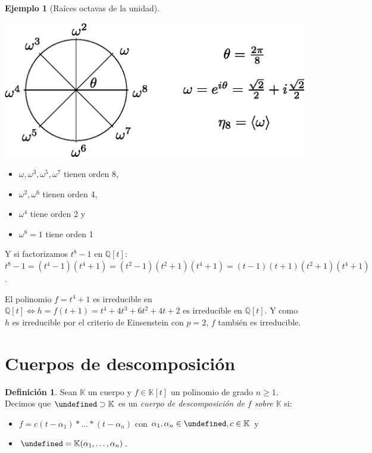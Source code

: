 \documentclass[10pt, spanish]{report}
\theoremstyle{definition}
\newtheorem*{defin}{Definición}
\newtheorem*{ej}{Ejemplo}
\newcommand{\Q}{\mathbb{Q}}
\newcommand{\K}{\mathbb{K}}
\let\L\undefined
\newcommand{\L}{\mathbb{L}}
\renewcommand{\geq}{\geqslant}
\newcommand{\fecha}[1]{\marginpar{\underline{\footnotesize{#1}}}}
\begin{document}
\fecha{3/03}
\begin{ej}[Raíces octavas de la unidad]\hspace{2em}\vspace{1em}
    \begin{multicols}{2}

        \includegraphics[scale=0.6]{fig01.eps}
    \begin{itemize}
        \item $\omega,\omega^3,\omega^5,\omega^7$  tienen orden 8,
        \item $\omega^2,\omega^6$ tienen orden 4,
        \item $\omega^4$ tiene orden 2 y
        \item $\omega^8=1$ tiene orden 1
    \end{itemize}


    \end{multicols}

    Y si factorizamos $t^8-1$ en $\Q[t]$:
    $t^8-1=(t^4-1)(t^4+1)=(t^2-1)(t^2+1)(t^4+1)=(t-1)(t+1)(t^2+1)(t^4+1)$.

    El polinomio $f=t^4+1$ es irreducible en $\Q[t] \Leftrightarrow
    h=f(t+1)=t^4+4t^3+6t^2+4t+2$  es irreducible en $\Q[t]$. Y como $h$ es
    irreducible por el criterio de Einsenstein con $p=2$, $f$ también es
    irreducible.
\end{ej}

\section{Cuerpos de descomposición}

\begin{defin}
    Sean $\K$ un cuerpo y $f\in\K[t]$ un polinomio de grado $n\geq1$. Decimos
    que $\L\supset\K$ es un \textit{cuerpo de descomposición de $f$ sobre $\K$}
    si:
    \begin{itemize}
        \item $f=c(t-\alpha_1)*\ldots*(t-\alpha_n)$ con $\alpha_1,\alpha_n\in\L, c\in \K$
            y
        \item $\L=\K(\alpha_1,\ldots,\alpha_n)$.
    \end{itemize}
\end{defin}
\end{document}
